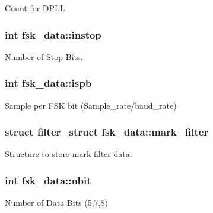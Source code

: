 Count for D\+P\+L\+L. 

\hypertarget{structfsk__data_ae360946d35657de50d454a9f3e63ab8a}{}
\subsubsection[{instop}]{\setlength{\rightskip}{0pt plus 5cm}int fsk\+\_\+data\+::instop}\label{structfsk__data_ae360946d35657de50d454a9f3e63ab8a}


Number of Stop Bits. 

\hypertarget{structfsk__data_a39a41190627091dd0d1e7e8eabb7c095}{}
\subsubsection[{ispb}]{\setlength{\rightskip}{0pt plus 5cm}int fsk\+\_\+data\+::ispb}\label{structfsk__data_a39a41190627091dd0d1e7e8eabb7c095}


Sample per F\+S\+K bit (Sample\+\_\+rate/baud\+\_\+rate) 

\hypertarget{structfsk__data_a78dccf8a4139f58535535117265ef49c}{}
\subsubsection[{mark\+\_\+filter}]{\setlength{\rightskip}{0pt plus 5cm}struct {\bf filter\+\_\+struct} fsk\+\_\+data\+::mark\+\_\+filter}\label{structfsk__data_a78dccf8a4139f58535535117265ef49c}


Structure to store mark filter data. 

\hypertarget{structfsk__data_a7d3b5ed8a33198ce8957052257f3ff8e}{}
\subsubsection[{nbit}]{\setlength{\rightskip}{0pt plus 5cm}int fsk\+\_\+data\+::nbit}\label{structfsk__data_a7d3b5ed8a33198ce8957052257f3ff8e}


Number of Data Bits (5,7,8) 

\hypertarget{structfsk__data_afc8612ac1878ff9b31ea6dcf5e712faf}{}
